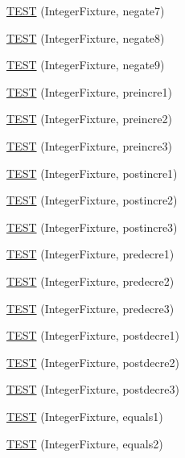 \begin{DoxyCompactItemize}
\hyperlink{_test_integer_8c_09_09_a7d3356c408dd32d46bc3400907aa2c45}{T\-E\-S\-T} (Integer\-Fixture, negate7)
\item 
\hyperlink{_test_integer_8c_09_09_ae65e6b7bb37558da7aeedb312f8c90e6}{T\-E\-S\-T} (Integer\-Fixture, negate8)
\item 
\hyperlink{_test_integer_8c_09_09_a6606563c740df8229b8988a0e3346367}{T\-E\-S\-T} (Integer\-Fixture, negate9)
\item 
\hyperlink{_test_integer_8c_09_09_a1f411d2ecb4bbe7bd8e3268414fa3dc4}{T\-E\-S\-T} (Integer\-Fixture, preincre1)
\item 
\hyperlink{_test_integer_8c_09_09_adfc83751099bbc9145926ba054a8c453}{T\-E\-S\-T} (Integer\-Fixture, preincre2)
\item 
\hyperlink{_test_integer_8c_09_09_a607e96817960ad36ec733c7b434545cb}{T\-E\-S\-T} (Integer\-Fixture, preincre3)
\item 
\hyperlink{_test_integer_8c_09_09_a0bce5ae03cef7d2b19d25c00f9b560bc}{T\-E\-S\-T} (Integer\-Fixture, postincre1)
\item 
\hyperlink{_test_integer_8c_09_09_afa91fad76d9e16f540f9020f94b3d0ff}{T\-E\-S\-T} (Integer\-Fixture, postincre2)
\item 
\hyperlink{_test_integer_8c_09_09_aebfdb0ec2a3c8ef3a9b51d566a0977fe}{T\-E\-S\-T} (Integer\-Fixture, postincre3)
\item 
\hyperlink{_test_integer_8c_09_09_a52f8ef4525309c8c25d5e8f15ca248fa}{T\-E\-S\-T} (Integer\-Fixture, predecre1)
\item 
\hyperlink{_test_integer_8c_09_09_a93618a456d9df7d3cc8d5fd437ff0ebe}{T\-E\-S\-T} (Integer\-Fixture, predecre2)
\item 
\hyperlink{_test_integer_8c_09_09_a8f38c4c615ca619567542d2c37e25c8d}{T\-E\-S\-T} (Integer\-Fixture, predecre3)
\item 
\hyperlink{_test_integer_8c_09_09_adf469567531cb9fa3a037598936bf0e3}{T\-E\-S\-T} (Integer\-Fixture, postdecre1)
\item 
\hyperlink{_test_integer_8c_09_09_a489040d9f34489502fc159950ee4c22b}{T\-E\-S\-T} (Integer\-Fixture, postdecre2)
\item 
\hyperlink{_test_integer_8c_09_09_a5e5bd8e1a2178f726f13b3eb481d1070}{T\-E\-S\-T} (Integer\-Fixture, postdecre3)
\item 
\hyperlink{_test_integer_8c_09_09_af49f1526a846a2abaecb1266a2aa53d5}{T\-E\-S\-T} (Integer\-Fixture, equals1)
\item 
\hyperlink{_test_integer_8c_09_09_ae58932a92711f57ac65494c4ead377d2}{T\-E\-S\-T} (Integer\-Fixture, equals2)

\end{DoxyCompactItemize}

